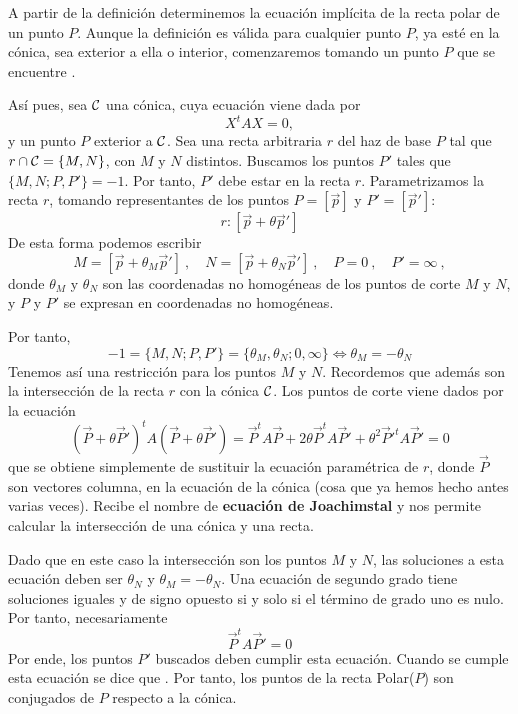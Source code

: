 A partir de la definición determinemos la ecuación implícita de la recta polar de un punto $P$. Aunque la definición es válida para cualquier punto $P$, ya esté en la cónica, sea exterior a ella o interior, comenzaremos tomando un punto $P$ que se encuentre . 

Así pues, sea $\mathcal{C}$ una cónica, cuya ecuación viene dada por
\begin{equation}
X^tAX=0,
\end{equation}
y un punto $P$ exterior a $\mathcal{C}$. Sea una recta arbitraria $r$ del haz de base $P$ tal que $r\cap \mathcal{C}=\{M,N\}$, con $M$ y $N$ distintos. Buscamos los puntos $P'$ tales que $\{M,N;P,P'\}=-1$. Por tanto, $P'$ debe estar en la recta $r$. Parametrizamos la recta $r$, tomando representantes de los puntos $P=[\vec{p}]$ y $P'=[\vec{p}']$:
\begin{equation*}
	r:[\vec{p}+\theta \vec{p}']
\end{equation*}
De esta forma podemos escribir
\begin{equation*}
	M=[\vec{p}+\theta_M \vec{p}'] \ , \quad N=[\vec{p}+\theta_N \vec{p}'] \ , \quad P=0 \ , \quad P'=\infty \ ,
\end{equation*}
donde $\theta_M$ y $\theta_N$ son las coordenadas no homogéneas de los puntos de corte $M$ y $N$, y $P$ y $P'$ se expresan en coordenadas no homogéneas.

Por tanto, 
\begin{equation}
-1=\{M,N;P,P'\}=\{\theta_M,\theta_N;0,\infty\}\Leftrightarrow \theta_M=-\theta_N
\end{equation}
Tenemos así una restricción para los puntos $M$ y $N$. Recordemos que además son la intersección de la recta $r$ con la cónica $\mathcal{C}$. Los puntos de corte viene dados por la ecuación
\begin{equation}
(\vec{P}+\theta \vec{P}')^tA(\vec{P}+\theta \vec{P}')=\vec{P}^tA\vec{P}+2\theta \vec{P}^tA\vec{P}'+\theta^2\vec{P}'^tA\vec{P}'=0
\end{equation}
que se obtiene simplemente de sustituir la ecuación paramétrica de $r$, donde $\vec{P}$ son vectores columna, en la ecuación de la cónica (cosa que ya hemos hecho antes varias veces). Recibe el nombre de \textbf{ecuación de Joachimstal} y nos permite calcular la intersección de una cónica y una recta.

Dado que en este caso la intersección son los puntos $M$ y $N$, las soluciones a esta ecuación deben ser $\theta_N$ y $\theta_M=-\theta_N$. Una ecuación de segundo grado tiene soluciones iguales y de signo opuesto si y solo si el término de grado uno es nulo. Por tanto, necesariamente
\begin{equation}\label{C8_eq_puntos_recta_polar}
\vec{P}^tA\vec{P}'=0
\end{equation}
Por ende, los puntos $P'$ buscados deben cumplir esta ecuación. Cuando se cumple esta ecuación se dice que . Por tanto, los puntos de la recta Polar($P$) son conjugados de $P$ respecto a la cónica.

